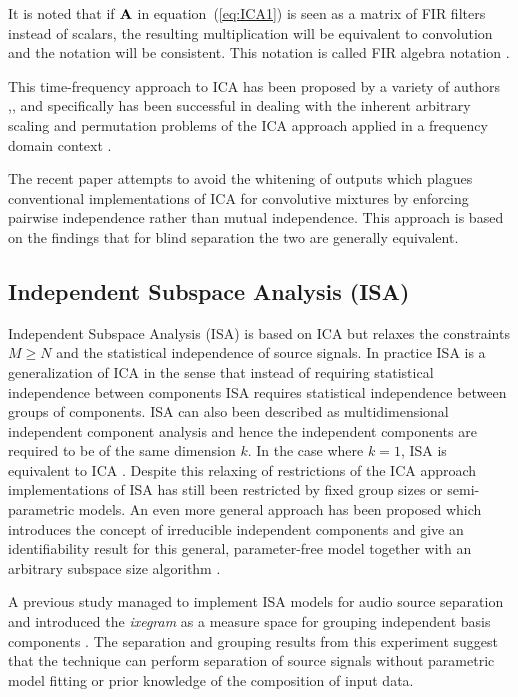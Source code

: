 It is noted that if $\textrm{\textbf{A}}$ in equation~(\ref{eq:ICA1}) is seen as a matrix of FIR filters instead of scalars, the resulting multiplication will be equivalent to convolution and the notation will be consistent. This notation is called FIR algebra notation \citep{Lambert1996}.

This time-frequency approach to ICA has been proposed by a variety of authors \citep{Lee1998},\citep{Ikeda1999},\citep{Smaragdis1998} and specifically \cite{Ikeda1999} has been successful in dealing with the inherent arbitrary scaling and permutation problems of the ICA approach applied in a frequency domain context \citep{Zhang2007}.

The recent paper \cite{Zhang2007} attempts to avoid the whitening of outputs which plagues conventional implementations of ICA for convolutive mixtures by enforcing pairwise independence rather than mutual independence. This approach is based on the findings that for blind separation the two are generally equivalent.

\subsection{Independent Subspace Analysis (ISA)}
Independent Subspace Analysis (ISA) is based on ICA but relaxes the constraints $M\geq N$ and the statistical independence of source signals. In practice ISA is a generalization of ICA in the sense that instead of requiring statistical independence between components ISA requires statistical independence between groups of components. ISA can also been described as multidimensional independent component analysis and hence the independent components are required to be of the same dimension $k$. In the case where $k = 1$, ISA is equivalent to ICA \citep{Theis2006}. Despite this relaxing of restrictions of the ICA approach implementations of ISA has still been restricted by fixed group sizes or semi-parametric models. An even more general approach has been proposed which introduces the concept of irreducible independent components and give an identifiability result for this general, parameter-free model together with an arbitrary subspace size algorithm \citep{Theis2006}.

A previous study managed to implement ISA models for audio source separation and introduced the \emph{ixegram} as a measure space for grouping independent basis components \citep{Casey2000}. The separation and grouping results from this experiment suggest that the technique can perform separation of source signals without parametric model fitting or prior knowledge of the composition of input data.

